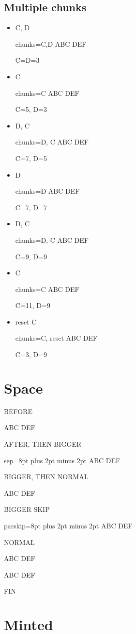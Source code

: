 \documentclass{article}
\begin{document}
\subsection{Multiple chunks}
\begin{itemize}
\item C, D
\begin{InlineCode}{chunks={C,D}}
ABC
DEF
\end{InlineCode}
C=D=3
\item C
\begin{InlineCode}{chunks=C}
ABC
DEF
\end{InlineCode}
C=5, D=3
\item D, C
\begin{InlineCode}{chunks={D, C}}
ABC
DEF
\end{InlineCode}
C=7, D=5
\item D
\begin{InlineCode}{chunks=D}
ABC
DEF
\end{InlineCode}
C=7, D=7
\item D, C
\begin{InlineCode}{chunks={D, C}}
ABC
DEF
\end{InlineCode}
C=9, D=9
\item C
\begin{InlineCode}{chunks={C}}
ABC
DEF
\end{InlineCode}
C=11, D=9
\item reset C
\begin{InlineCode}{chunks={C}, reset}
ABC
DEF
\end{InlineCode}
C=3, D=9
\end{itemize}
\section{Space}
BEFORE
\begin{InlineCode}{}
ABC
DEF
\end{InlineCode}
AFTER, THEN BIGGER
\begin{InlineCode}{sep=8pt plus 2pt minus 2pt}
ABC
DEF
\end{InlineCode}
BIGGER, THEN NORMAL
\begin{InlineCode}{}
ABC
DEF
\end{InlineCode}
BIGGER SKIP
\begin{InlineCode}{parskip=8pt plus 2pt minus 2pt}
ABC
DEF
\end{InlineCode}
NORMAL
\InlineCodeSet{}%
\begin{InlineCode}{}
ABC
DEF
\end{InlineCode}
\begin{InlineCode}{}
ABC
DEF
\end{InlineCode}
FIN
\section{Minted}
\end{document}
